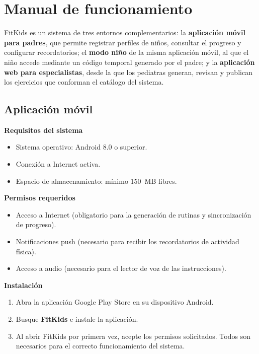 		\section{Manual de funcionamiento}
		\label{sec:manual}
			FitKids es un sistema de tres entornos complementarios: la \textbf{aplicación móvil para padres}, que permite registrar perfiles de niños, consultar el progreso y configurar recordatorios; el \textbf{modo niño} de la misma aplicación móvil, al que el niño accede mediante un código temporal generado por el padre; y la \textbf{aplicación web para especialistas}, desde la que los pediatras generan, revisan y publican los ejercicios que conforman el catálogo del sistema.
			
			\subsection{Aplicación móvil}
			\label{sec:appmovil}
				\textbf{Requisitos del sistema}
				
				\begin{itemize}
					\item Sistema operativo: Android 8.0 o superior.
					\item Conexión a Internet activa.
					\item Espacio de almacenamiento: mínimo 150~MB libres.
				\end{itemize}
				
				\textbf{Permisos requeridos}
				
				\begin{itemize}
					\item Acceso a Internet (obligatorio para la generación de rutinas y sincronización de progreso).
					\item Notificaciones push (necesario para recibir los recordatorios de actividad física).
					\item Acceso a audio (necesario para el lector de voz de las instrucciones).
				\end{itemize}
				
				\textbf{Instalación}
				
				\begin{enumerate}
					\item Abra la aplicación Google Play Store en su dispositivo Android.
					\item Busque \textbf{FitKids} e instale la aplicación.
					\item Al abrir FitKids por primera vez, acepte los permisos solicitados. Todos son necesarios para el correcto funcionamiento del sistema.
				\end{enumerate}
				
